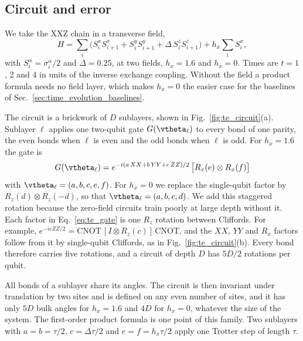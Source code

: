 \subsection{Circuit and error}
\label{sec:time_evolution_setup}

We take the XXZ chain in a transverse field,
\begin{equation}
H = \sum_{i} \big( S^x_i S^x_{i+1} + S^y_i S^y_{i+1} + \Delta\, S^z_i S^z_{i+1} \big) + h_x \sum_{i} S^x_i ,
\label{eq:te_ham}
\end{equation}
with $S^{\alpha}_i = \sigma^{\alpha}_i/2$ and $\Delta = 0.25$, at two fields, $h_x = 1.6$ and $h_x = 0$. Times are $t = 1$, 2 and 4 in units of the inverse exchange coupling. Without the field a product formula needs no field layer, which makes $h_x = 0$ the easier case for the baselines of Sec.~\ref{sec:time_evolution_baselines}. 

The circuit is a brickwork of $D$ sublayers, shown in Fig.~\ref{fig:te_circuit}(a). Sublayer $\ell$ applies one two-qubit gate $G(\vtheta_\ell)$ to every bond of one parity, the even bonds when $\ell$ is even and the odd bonds when $\ell$ is odd. For $h_x = 1.6$ the gate is
\begin{equation}
G(\vtheta_\ell) = e^{-i(a\,XX + b\,YY + c\,ZZ)/2}\, \big[ R_x(e) \otimes R_x(f) \big]
\label{eq:te_gate}
\end{equation}
with $\vtheta_\ell = (a, b, c, e, f)$. For $h_x = 0$ we replace the single-qubit factor by $R_z(d) \otimes R_z(-d)$, so that $\vtheta_\ell = (a, b, c, d)$. We add this staggered rotation because the zero-field circuits train poorly at large depth without it. Each factor in Eq.~\eqref{eq:te_gate} is one $R_z$ rotation between Cliffords. For example, $e^{-icZZ/2} = \mathrm{CNOT}\,[I \otimes R_z(c)]\,\mathrm{CNOT}$, and the $XX$, $YY$ and $R_x$ factors follow from it by single-qubit Cliffords, as in Fig.~\ref{fig:te_circuit}(b). Every bond therefore carries five rotations, and a circuit of depth $D$ has $5D/2$ rotations per qubit.

All bonds of a sublayer share its angles. The circuit is then invariant under translation by two sites and is defined on any even number of sites, and it has only $5D$ bulk angles for $h_x = 1.6$ and $4D$ for $h_x = 0$, whatever the size of the system. The first-order product formula is one point of this family. Two sublayers with $a = b = \tau/2$, $c = \Delta\tau/2$ and $e = f = h_x\tau/2$ apply one Trotter step of length $\tau$.

